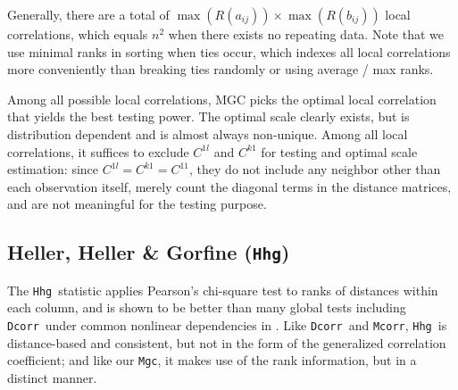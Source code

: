 \documentclass[11pt]{article}
\providecommand{\sct}[1]{{\sc \texttt{#1}}}
\newcommand{\G}{C}
\newcommand{\Mgc}{\sct{Mgc}}
\newcommand{\Hhg}{\sct{Hhg}}
\newcommand{\Dcorr}{\sct{Dcorr}}
\newcommand{\Mcorr}{\sct{Mcorr}}
\begin{document}
Generally, there are a total of $\max(R(a_{ij})) \times \max(R(b_{ij}))$ local correlations, which equals $n^2$ when there exists no repeating data. Note that we use minimal ranks in sorting when ties occur, which indexes all local correlations more conveniently than breaking ties randomly or using average / max ranks.

Among all possible local correlations, MGC picks the optimal local correlation that yields the best testing power. The optimal scale clearly exists, but is distribution dependent and is almost always non-unique. Among all local correlations, it suffices to exclude $\G^{1l}$ and $\G^{k1}$ for testing and optimal scale estimation: since $\G^{1l}=\G^{k1}=\G^{11}$, they do not include any neighbor other than each observation itself, merely count the diagonal terms in the distance matrices, and are not meaningful for the testing purpose.


\subsection{Heller, Heller \& Gorfine (\Hhg)}
\label{appen:hhg}
The \Hhg~statistic applies Pearson's chi-square test to ranks of distances within each column, and is shown to be better than many global tests including \Dcorr~under common nonlinear dependencies in \cite{GorfineHellerHeller2012, HellerGorfine2013}. Like \Dcorr~and \Mcorr, \Hhg~is distance-based and consistent, but not in the form of the generalized correlation coefficient; and like our \Mgc, it makes use of the rank information, but in a distinct manner.
\end{document}
